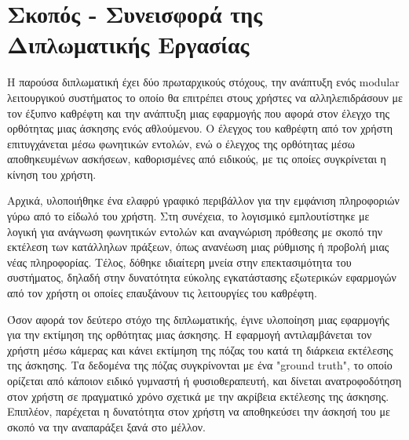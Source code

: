 \section{Σκοπός - Συνεισφορά της Διπλωματικής Εργασίας}
\label{section:contribution}

Η παρούσα διπλωματική έχει δύο πρωταρχικούς στόχους, την ανάπτυξη ενός modular λειτουργικού συστήματος το οποίο θα επιτρέπει στους χρήστες να αλληλεπιδράσουν με τον έξυπνο καθρέφτη και την ανάπτυξη μιας εφαρμογής που αφορά στον έλεγχο της ορθότητας μιας άσκησης ενός αθλούμενου. Ο έλεγχος του καθρέφτη από τον χρήστη επιτυγχάνεται μέσω φωνητικών εντολών, ενώ ο έλεγχος της ορθότητας μέσω αποθηκευμένων ασκήσεων, καθορισμένες από ειδικούς, με τις οποίες συγκρίνεται η κίνηση του χρήστη.

Αρχικά, υλοποιήθηκε ένα ελαφρύ γραφικό περιβάλλον για την εμφάνιση πληροφοριών γύρω από το είδωλό του χρήστη. Στη συνέχεια, το λογισμικό εμπλουτίστηκε με λογική για ανάγνωση φωνητικών εντολών και αναγνώριση πρόθεσης με σκοπό την εκτέλεση των κατάλληλων πράξεων, όπως ανανέωση μιας ρύθμισης ή προβολή μιας νέας πληροφορίας. Τέλος, δόθηκε ιδιαίτερη μνεία στην επεκτασιμότητα του συστήματος, δηλαδή στην δυνατότητα εύκολης εγκατάστασης εξωτερικών εφαρμογών από τον χρήστη οι οποίες επαυξάνουν τις λειτουργίες του καθρέφτη.

Όσον αφορά τον δεύτερο στόχο της διπλωματικής, έγινε υλοποίηση μιας εφαρμογής για την εκτίμηση της ορθότητας μιας άσκησης. Η εφαρμογή αντιλαμβάνεται τον χρήστη μέσω κάμερας και κάνει εκτίμηση της πόζας του κατά τη διάρκεια εκτέλεσης της άσκησης. Τα δεδομένα της πόζας συγκρίνονται με ένα "ground truth", το οποίο ορίζεται από κάποιον ειδικό γυμναστή ή φυσιοθεραπευτή, και δίνεται ανατροφοδότηση στον χρήστη σε πραγματικό χρόνο σχετικά με την ακρίβεια εκτέλεσης της άσκησης. Επιπλέον, παρέχεται η δυνατότητα στον χρήστη να αποθηκεύσει την άσκησή του με σκοπό να την αναπαράξει ξανά στο μέλλον.